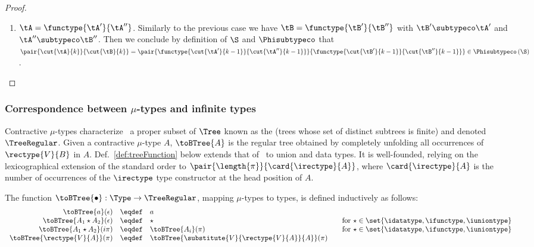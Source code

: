 \begin{proof}
\begin{enumerate}
  \item $\tA = \functype{\tA'}{\tA''}$. Similarly to the previous case we have
  $\tB = \functype{\tB'}{\tB''}$ with $\tB' \subtypeco \tA'$ and $\tA''
  \subtypeco \tB''$. Then we conclude by definition of $\S$ and $\Phisubtypeco$
  that $\pair{\cut{\tA}{k}}{\cut{\tB}{k}} =
  \pair{\functype{\cut{\tA'}{k-1}}{\cut{\tA''}{k-1}}}{\functype{\cut{\tB'}{k-1}}{\cut{\tB''}{k-1}}}
  \in \Phisubtypeco\left(\S\right)$.
\end{enumerate}
\end{proof}



\subsubsection{Correspondence between \texorpdfstring{$\mu$}{u}-types and infinite types}


Contractive $\mu$-types
characterize~\cite{journals/tcs/Courcelle83,DBLP:journals/toplas/AmadioC93,DBLP:journals/fuin/BrandtH98,Pierce:2002:TPL:509043}
a proper subset of $\Tree$ known as the  (trees whose
set of distinct subtrees is finite) and denoted $\TreeRegular$.
Given a contractive $\mu$-type $A$, $\toBTree{A}$ is the regular tree obtained
by completely unfolding all occurrences of $\rectype{V}{B}$ in $A$.
Def.~\ref{def:treeFunction} below extends that of~\cite{Pierce:2002:TPL:509043}
to union and data types. It is well-founded, relying on the lexicographical
extension of the standard order to $\pair{\length{\pi}}{\card{\irectype}{A}}$,
where $\card{\irectype}{A}$ is the number of occurrences of the $\irectype$
type constructor at the head position of $A$.

\begin{definition}
\label{def:treeFunction}
The function $\toBTree{\bullet} : \Type \to \TreeRegular$, mapping $\mu$-types to types, is defined inductively as follows: $$
\begin{array}{rcll}
\toBTree{a}(\epsilon)             & \eqdef & a \\
\toBTree{A_1 \star A_2}(\epsilon) & \eqdef & \star           & \quad \text{for $\star \in \set{\idatatype, \ifunctype, \iuniontype}$} \\
\toBTree{A_1 \star A_2}(i\pi)     & \eqdef & \toBTree{A_i}(\pi) & \quad \text{for $\star \in \set{\idatatype, \ifunctype, \iuniontype}$} \\
\toBTree{\rectype{V}{A}}(\pi)     & \eqdef & \toBTree{\substitute{V}{\rectype{V}{A}}{A}}(\pi) \\
\end{array} $$
\end{definition}



